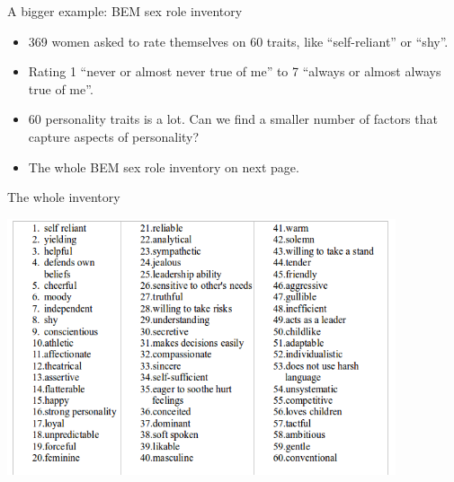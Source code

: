 \begin{frame}[fragile]{A bigger example: BEM sex role inventory}

  \begin{itemize}
  \item 369 women asked to rate themselves on 60 traits, like ``self-reliant'' or ``shy''.
  \item Rating 1 ``never or almost never true of me'' to 7 ``always or almost always true of me''.
  \item 60 personality traits is a lot. Can we find a smaller number of factors that capture aspects of personality?
  \item The whole BEM sex role inventory on next page.
  \end{itemize}
  
\end{frame}

\begin{frame}[fragile]{The whole inventory}

\includegraphics[width=4.5in]{bem}

\end{frame}

